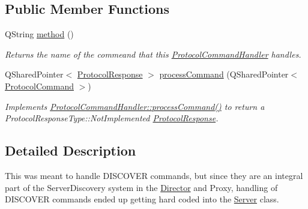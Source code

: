 \subsection*{Public Member Functions}
\begin{DoxyCompactItemize}
\item 
\hypertarget{struct_picto_1_1_discover_command_handler_abc9834c2ea52b291c32b9a005f541b1f}{Q\-String \hyperlink{struct_picto_1_1_discover_command_handler_abc9834c2ea52b291c32b9a005f541b1f}{method} ()}\label{struct_picto_1_1_discover_command_handler_abc9834c2ea52b291c32b9a005f541b1f}

\begin{DoxyCompactList}\small\item\em Returns the name of the commeand that this \hyperlink{struct_picto_1_1_protocol_command_handler}{Protocol\-Command\-Handler} handles. \end{DoxyCompactList}\item 
\hypertarget{struct_picto_1_1_discover_command_handler_aa3c37f3df31d9b7ad4e361d51ccc3476}{Q\-Shared\-Pointer$<$ \hyperlink{struct_picto_1_1_protocol_response}{Protocol\-Response} $>$ \hyperlink{struct_picto_1_1_discover_command_handler_aa3c37f3df31d9b7ad4e361d51ccc3476}{process\-Command} (Q\-Shared\-Pointer$<$ \hyperlink{struct_picto_1_1_protocol_command}{Protocol\-Command} $>$)}\label{struct_picto_1_1_discover_command_handler_aa3c37f3df31d9b7ad4e361d51ccc3476}

\begin{DoxyCompactList}\small\item\em Implements \hyperlink{struct_picto_1_1_protocol_command_handler_aeeaa16fe40f10fd55996d74e16e29cad}{Protocol\-Command\-Handler\-::process\-Command()} to return a Protocol\-Response\-Type\-::\-Not\-Implemented \hyperlink{struct_picto_1_1_protocol_response}{Protocol\-Response}. \end{DoxyCompactList}\end{DoxyCompactItemize}


\subsection{Detailed Description}
This was meant to handle D\-I\-S\-C\-O\-V\-E\-R commands, but since they are an integral part of the Server\-Discovery system in the \hyperlink{class_director}{Director} and Proxy, handling of D\-I\-S\-C\-O\-V\-E\-R commands ended up getting hard coded into the \hyperlink{class_server}{Server} class. 

